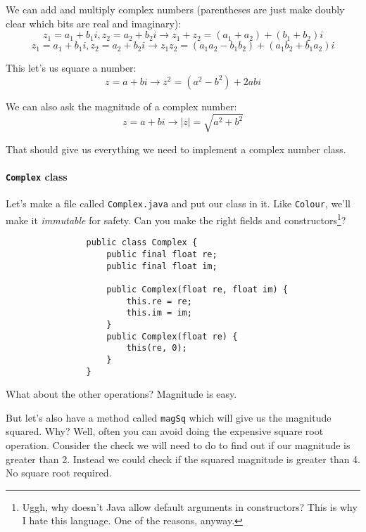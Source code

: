 \documentclass{article}
\begin{document}
            
            We can add and multiply complex numbers (parentheses are just make doubly clear which bits are real and imaginary):
            $$z_1 = a_1 + b_1i, z_2 = a_2 + b_2i \rightarrow z_1 + z_2 = (a_1 + a_2) + (b_1 + b_2)i$$
            $$z_1 = a_1 + b_1i, z_2 = a_2 + b_2i \rightarrow z_1   z_2 = (a_1   a_2 - b_1   b_2) + (a_1   b_2 + b_1   a_2)i$$

            This let's us square a number:
            $$z = a + bi \rightarrow z^2 = (a^2 - b^2) + 2abi$$

            We can also ask the magnitude of a complex number:
            $$z = a + bi \rightarrow |z| = \sqrt{a^2 + b^2}$$
            
            That should give us everything we need to implement a complex number class.
        
        \paragraph{\texttt{Complex} class}
            Let's make a file called \texttt{Complex.java} and put our class in it. Like \texttt{Colour}, we'll make it \emph{immutable}
            for safety. Can you make the right fields and constructors\footnote{Uggh, why doesn't Java allow default arguments in
            constructors? This is why I hate this language. One of the reasons, anyway.}?
            
            \begin{verbatim}
                public class Complex {
                    public final float re;
                    public final float im;
                    
                    public Complex(float re, float im) {
                        this.re = re;
                        this.im = im;
                    }
                    public Complex(float re) {
                        this(re, 0);
                    }
                }
            \end{verbatim}
            
            What about the other operations? Magnitude is easy. 

            But let's also have a method called \texttt{magSq} which will give us the magnitude squared. Why? Well, often you can avoid
            doing the expensive square root operation. Consider the check we will need to do to find out if our magnitude is greater than
            2. Instead we could check if the squared magnitude is greater than 4. No square root required.
\end{document}

